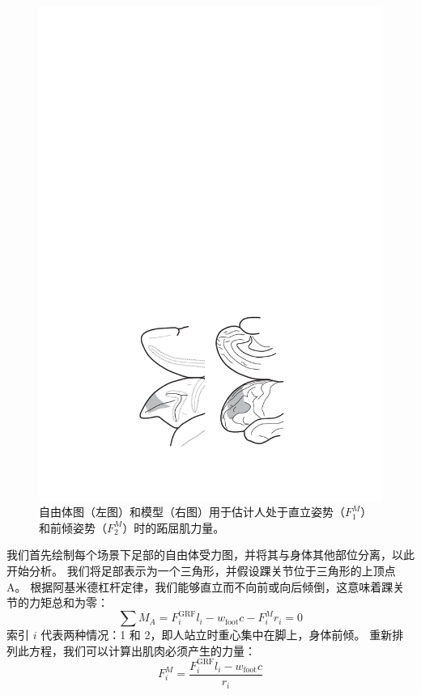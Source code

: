 \begin{figure}[!htb]
	\centering
	\includegraphics[width=0.9\linewidth]{chap6/6_1}
	\caption{自由体图（左图）和模型（右图）用于估计人处于直立姿势（$F_1^M$）和前倾姿势（$F_2^M$）时的跖屈肌力量。 \label{fig:6_1}}
\end{figure}


我们首先绘制每个场景下足部的自由体受力图，并将其与身体其他部位分离，以此开始分析。
我们将足部表示为一个三角形，并假设踝关节位于三角形的上顶点 A。
根据阿基米德杠杆定律，我们能够直立而不向前或向后倾倒，这意味着踝关节的力矩总和为零：
%
\begin{equation}
	\sum M_A = F_i ^{\text{GRF}} l_i 
				- w_\text{foot} c
				- F_i ^M r_i
				= 0
	\label{eq:6_1}
\end{equation}
%
索引 $i$ 代表两种情况：1 和 2，即人站立时重心集中在脚上，身体前倾。
重新排列此方程，我们可以计算出肌肉必须产生的力量：
%
\begin{equation}
	F_i ^M = 
		\frac{
			F_i ^{\text{GRF}} l_i
			- w_\text{foot} c
		}{
			r_i
		}
	\label{eq:6_2}
\end{equation}


